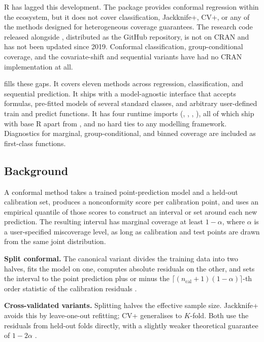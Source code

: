 R has lagged this development. The  package provides
conformal regression within the  ecosystem, but it
does not cover classification, Jackknife+, CV+, or any of the methods
designed for heterogeneous coverage guarantees. The research code
released alongside \citet{lei2018distribution}, distributed as the
 GitHub repository, is not on CRAN and has not
been updated since 2019. Conformal classification, group-conditional
coverage, and the covariate-shift and sequential variants have had no
CRAN implementation at all.

 fills these gaps. It covers eleven methods across
regression, classification, and sequential prediction. It ships with a
model-agnostic interface that accepts formulas, pre-fitted models of
several standard classes, and arbitrary user-defined train and predict
functions. It has four runtime imports (, ,
, ), all of which ship with base R apart from
, and no hard ties to any modelling framework. Diagnostics
for marginal, group-conditional, and binned coverage are included as
first-class functions.

\subsection{Background}\label{background}

A conformal method takes a trained point-prediction model and a held-out
calibration set, produces a nonconformity score per calibration point,
and uses an empirical quantile of those scores to construct an interval
or set around each new prediction. The resulting interval has marginal
coverage at least \(1-\alpha\), where \(\alpha\) is a user-specified
miscoverage level, as long as calibration and test points are drawn from
the same joint distribution.

\textbf{Split conformal.} The canonical variant divides the training
data into two halves, fits the model on one, computes absolute residuals
on the other, and sets the interval to the point prediction plus or
minus the \(\lceil(n_{\text{cal}}+1)(1-\alpha)\rceil\)-th order
statistic of the calibration residuals \citep{lei2018distribution}.

\textbf{Cross-validated variants.} Splitting halves the effective sample
size. Jackknife+ avoids this by leave-one-out refitting; CV+ generalises
to \(K\)-fold. Both use the residuals from held-out folds directly, with
a slightly weaker theoretical guarantee of \(1-2\alpha\)
\citep{barber2021predictive}.

